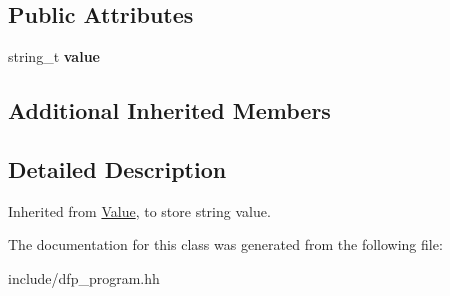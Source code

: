 \subsection*{Public Attributes}
\begin{DoxyCompactItemize}
\item 
string\+\_\+t {\bfseries value}\hypertarget{class_d_f_p_1_1_str_value_aa73f37af1d825788bfbc10cf74276876}{}\label{class_d_f_p_1_1_str_value_aa73f37af1d825788bfbc10cf74276876}

\end{DoxyCompactItemize}
\subsection*{Additional Inherited Members}


\subsection{Detailed Description}
Inherited from \hyperlink{class_d_f_p_1_1_value}{Value}, to store string value. 

The documentation for this class was generated from the following file\+:\begin{DoxyCompactItemize}
\item 
include/dfp\+\_\+program.\+hh\end{DoxyCompactItemize}
